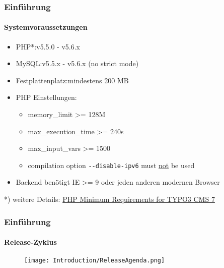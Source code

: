 \begin{frame}[fragile]
	\frametitle{Einführung}
	\framesubtitle{Systemvoraussetzungen}

	\begin{itemize}
		\item PHP*:\tabto{3cm}v5.5.0 - v5.6.x
		\item MySQL:\tabto{3cm}v5.5.x - v5.6.x (no strict mode)
		\item Festplattenplatz:\tabto{3cm}mindestens 200 MB
		\item PHP Einstellungen:

			\begin{itemize}
				\item memory\_limit >= 128M
				\item max\_execution\_time >= 240s
				\item max\_input\_vars >= 1500
				\item compilation option \texttt{-}\texttt{-disable-ipv6} must \underline{not} be used
			\end{itemize}

		\item Backend benötigt IE >= 9 oder jeden anderen modernen Browser

	\end{itemize}

	\vspace{0.8cm}

	*) weitere Details: \href{http://typo3.org/news/article/php-minimum-requirements-for-typo3-cms-7/}{PHP Minimum Requirements for TYPO3 CMS 7}

\end{frame}

\begin{frame}[fragile]
	\frametitle{Einführung}
	\framesubtitle{Release-Zyklus}

	\begin{figure}
		\texttt{[image: Introduction/ReleaseAgenda.png]}
	\end{figure}

\end{frame}

